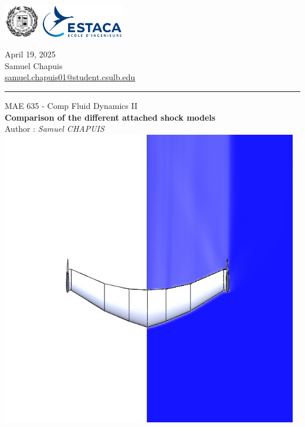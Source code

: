 \documentclass{article}
\begin{document}
\noindent
\begin{minipage}[t]{0.5\textwidth}
  \vspace{0pt}
  \includegraphics[height=1.5cm]{ressources/images/CSULB.png}\hspace{0.3cm}
  \includegraphics[height=1.5cm]{ressources/images/Estaca-Logo.png}
  \bigskip
\end{minipage}
\begin{minipage}[t]{0.5\textwidth}
  \vspace{8pt}
  \raggedleft
  April 19, 2025 \\
  Samuel Chapuis \\
  \href{mailto:samuel.chapuis01@student.csulb.edu}{samuel.chapuis01@student.csulb.edu} 
\end{minipage}




\rule{\linewidth}{1pt}

\begin{center}
	{\large MAE 635 - Comp Fluid Dynamics II} %
		\\[1.5cm]
		{\LARGE \textbf{Comparison of the different attached shock models}} %
		\\[0.5cm]
		Author : \textit{Samuel CHAPUIS}\\[2.5cm]

		\center 
		\includegraphics[height=13cm]{ressources/images/cover2.png}
\end{center}
\end{document}
